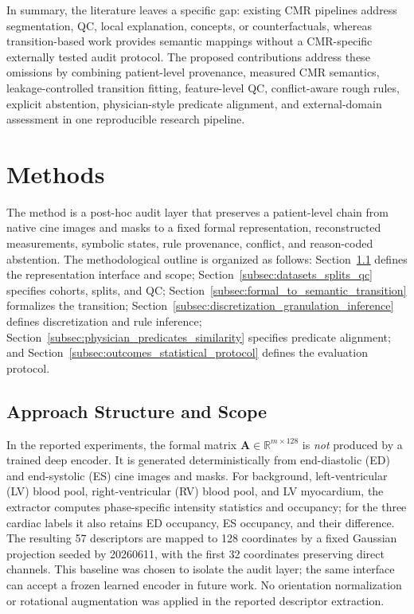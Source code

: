 \documentclass{ceurart}
\newcommand{\matA}{\mathbf{A}}
\newcommand{\R}{\mathbb{R}}
\begin{document}
In summary, the literature leaves a specific gap: existing CMR pipelines address segmentation, QC, local explanation, concepts, or counterfactuals, whereas transition-based work provides semantic mappings without a CMR-specific externally tested audit protocol. The proposed contributions address these omissions by combining patient-level provenance, measured CMR semantics, leakage-controlled transition fitting, feature-level QC, conflict-aware rough rules, explicit abstention, physician-style predicate alignment, and external-domain assessment in one reproducible research pipeline.

\section{Methods}\label{sec:methods}

The method is a post-hoc audit layer that preserves a patient-level chain from native cine images and masks to a fixed formal representation, reconstructed measurements, symbolic states, rule provenance, conflict, and reason-coded abstention. The methodological outline is organized as follows: Section~\ref{subsec:approach_structure_scope} defines the representation interface and scope; Section~\ref{subsec:datasets_splits_qc} specifies cohorts, splits, and QC; Section~\ref{subsec:formal_to_semantic_transition} formalizes the transition; Section~\ref{subsec:discretization_granulation_inference} defines discretization and rule inference; Section~\ref{subsec:physician_predicates_similarity} specifies predicate alignment; and Section~\ref{subsec:outcomes_statistical_protocol} defines the evaluation protocol.

\subsection{Approach Structure and Scope}\label{subsec:approach_structure_scope}

In the reported experiments, the formal matrix \(\matA\in\R^{m\times128}\) is \emph{not} produced by a trained deep encoder. It is generated deterministically from end-diastolic (ED) and end-systolic (ES) cine images and masks. For background, left-ventricular (LV) blood pool, right-ventricular (RV) blood pool, and LV myocardium, the extractor computes phase-specific intensity statistics and occupancy; for the three cardiac labels it also retains ED occupancy, ES occupancy, and their difference. The resulting 57 descriptors are mapped to 128 coordinates by a fixed Gaussian projection seeded by 20260611, with the first 32 coordinates preserving direct channels. This baseline was chosen to isolate the audit layer; the same interface can accept a frozen learned encoder in future work. No orientation normalization or rotational augmentation was applied in the reported descriptor extraction.
\end{document}
